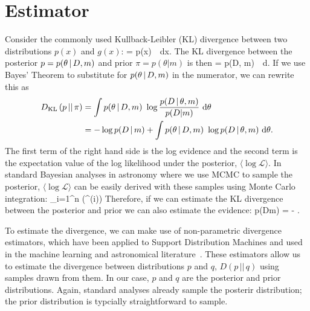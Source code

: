 \section{Estimator} \label{sec:estimator}
Consider the commonly used Kullback-Leibler (KL) divergence between two
distributions $p(x)$ and $g(x)$:
\beq
     = \int p(x)~\log{}~{\rm d}x. 
\eeq
The KL divergence between the posterior $p = p(\theta \,|\, D, m)$ and prior
$\pi = p(\theta | m)$ is then 
\beq
     = \int p(\theta \given D, m)~\log{}~{\rm d}\theta. 
\eeq
If we use Bayes' Theorem to substitute for $p(\theta \,|\, D, m)$ in the
numerator, we can rewrite this as 
\begin{align}
    D_{\rm KL}\left({p}\,||\,{\pi}\right) &= \int p(\theta \,|\, D,
    m)~\log\frac{p(D \,|\, \theta, m)}{p(D | m)}~{\rm d}\theta\\ 
        &= -\log p(D\,|\, m) + \int p(\theta \,|\, D, m)~\log p(D \,|\, \theta, m)~{\rm d}\theta. 
\end{align}
The first term of the right hand side is the log evidence and the second term
is the expectation value of the log likelihood under the posterior, $\big\langle
\log \mathcal{L} \big\rangle$. In standard Bayesian analyses in astronomy where
we use MCMC to sample the posterior, $\big\langle \log \mathcal{L} \big\rangle$
can be easily derived with these samples using Monte Carlo integration: 
\beq
\big\langle \log {} \big \rangle \approx {}
\sum\limits_{i=1}^{n} \log {}(\theta^{(i)})
\eeq
Therefore, if we can estimate the KL divergence between the posterior and prior
we can also estimate the evidence: 
\beq \label{eq:estimator}
\log p(D\given m) = \big\langle \log {} \big\rangle - .
\eeq

To estimate the divergence, we can make use of non-parametric divergence
estimators, which have been applied to Support Distribution Machines and 
used in the machine learning and astronomical literature~\citep[\emph{e.g.}][]{poczos2011,
poczos2012, poczos2012a, xu2013, ntampaka2015, ntampaka2016, ravanbakhsh2017,
hahn2019}. These estimators allow us to estimate the divergence between 
distributions $p$ and $q$, $D(p\,||\,q)$ using samples drawn from them. In 
our case, $p$ and $q$ are the posterior and prior distributions. Again,
standard analyses already sample the posterir distribution; the prior 
distribution is typcially straightforward to sample. 

